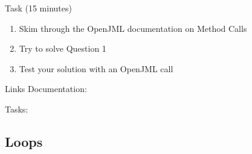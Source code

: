 \begin{frame}{\insertsubsection}
	
	\begin{fancycolumns}
		
		\begin{definition}{Task (15 minutes)}
			
			\begin{enumerate}
				\item Skim through the OpenJML documentation on Method Calls
				\item Try to solve Question 1
				\item Test your solution with an OpenJML call
			\end{enumerate}
		\end{definition}
		
		\nextcolumn
		
		\begin{example}{Links}
			Documentation: 
			\begin{center}
				\centering{}
			\end{center}
			
			
			Tasks: 
			\begin{center}
				\centering{}
			\end{center}
		\end{example}
		
	\end{fancycolumns}
\end{frame}

\subsection{Loops}

